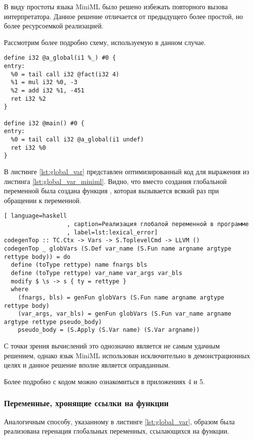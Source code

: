 В виду простоты языка MiniML было решено избежать повторного вызова интерпретатора.
Данное решение отличается от предыдущего более простой, но более ресурсоемкой реализацией.

Рассмотрим более подробно схему, используемую в данном случае.

\begin{lstlisting}[caption=Пример сгенерированного LLVM байткода для глобальной переменной
                  , label=lst:global_var]
define i32 @a_global(i1 %_) #0 {
entry:
  %0 = tail call i32 @fact(i32 4)
  %1 = mul i32 %0, -3
  %2 = add i32 %1, -451
  ret i32 %2
}

define i32 @main() #0 {
entry:
  %0 = tail call i32 @a_global(i1 undef)
  ret i32 %0
}
\end{lstlisting}

В листинге \ref{lst:global_var} представлен оптимизированный код для выражения из листинга \ref{lst:global_var_miniml}.
Видно, что вместо создания глобальной переменной  была создана функция ,
которая вызывается всякий раз при обращении к переменной.

\begin{lstlisting}[ language=haskell
                  , caption=Реализация глобалой переменной в программе
                  , label=lst:lexical_error]
codegenTop :: TC.Ctx -> Vars -> S.ToplevelCmd -> LLVM ()
codegenTop _ globVars (S.Def var_name (S.Fun name argname argtype rettype body)) = do
  define (toType rettype) name fnargs bls
  define (toType rettype) var_name var_args var_bls
  modify $ \s -> s { ty = rettype }
  where
    (fnargs, bls) = genFun globVars (S.Fun name argname argtype rettype body)
    (var_args, var_bls) = genFun globVars (S.Fun var_name argname argtype rettype pseudo_body)
    pseudo_body = (S.Apply (S.Var name) (S.Var argname))
\end{lstlisting}

С точки зрения вычислений это однозначно является не самым удачным решением, однако язык MiniML использован
исключительно в демонстрационных целях и данное решение вполне является оправданным.

Более подробно с кодом можно ознакомиться в приложениях 4 и 5.

\subsubsection{Переменные, хронящие ссылки на функции}

Аналогичным способу, указанному в листинге \ref{lst:global_var}, образом была
реализована геренация глобальных переменных, ссылающихся на функции.

